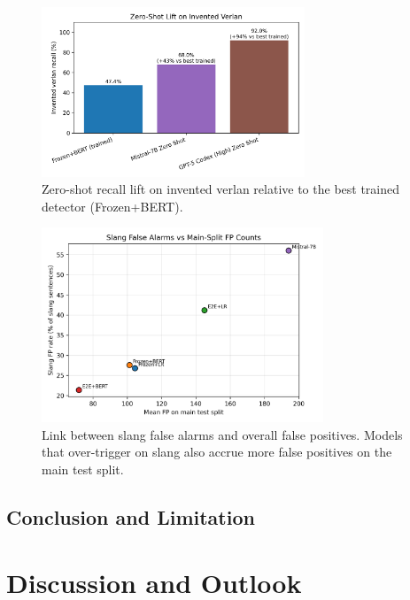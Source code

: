 \documentclass[12pt]{article}
\begin{document}
\begin{figure}[H]
    \centering
    \includegraphics[width=0.7\textwidth]{figures/invented_relative_improvement.png}
    \caption{Zero-shot recall lift on invented verlan relative to the best trained detector (Frozen+BERT).}
    \label{fig:invented-lift}
\end{figure}

\begin{figure}[H]
    \centering
    \includegraphics[width=0.75\textwidth]{figures/slang_fp_vs_main_fp.png}
    \caption{Link between slang false alarms and overall false positives.  Models that over-trigger on slang also accrue more false positives on the main test split.}
    \label{fig:slang-fp-correlation}
\end{figure}



\subsection{Conclusion and Limitation}

\section{Discussion and Outlook}
\end{document}
